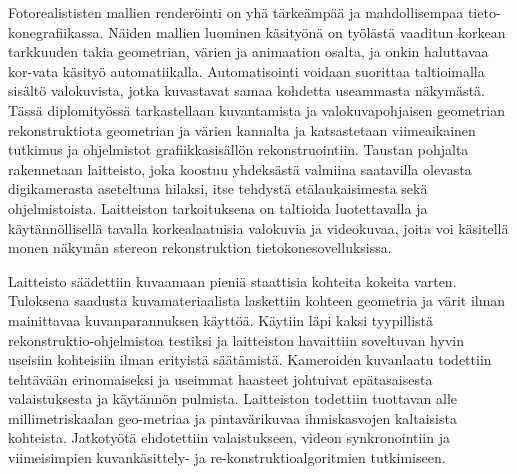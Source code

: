 \begin{abstractpage}[finnish]
Fotorealististen mallien renderöinti on yhä tärkeämpää ja mahdollisempaa tieto-konegrafiikassa.
Näiden mallien luominen käsityönä on työlästä vaaditun korkean tarkkuuden takia geometrian, värien ja animaation osalta, ja onkin haluttavaa kor-vata käsityö automatiikalla.
Automatisointi voidaan suorittaa taltioimalla sisältö valokuvista, jotka kuvastavat samaa kohdetta useammasta näkymästä.
Tässä diplomityössä tarkastellaan kuvantamista ja valokuvapohjaisen geometrian rekonstruktiota geometrian ja värien kannalta ja katsastetaan viimeaikainen tutkimus ja ohjelmistot grafiikkasisällön rekonstruointiin.
Taustan pohjalta rakennetaan laitteisto, joka koostuu yhdeksästä valmiina saatavilla olevasta digikamerasta aseteltuna hilaksi, itse tehdystä etälaukaisimesta sekä ohjelmistoista.
Laitteiston tarkoituksena on taltioida luotettavalla ja käytännöllisellä tavalla korkealaatuisia valokuvia ja videokuvaa, joita voi käsitellä monen näkymän stereon rekonstruktion tietokonesovelluksissa.

Laitteisto säädettiin kuvaamaan pieniä staattisia kohteita kokeita varten.
Tuloksena saadusta kuvamateriaalista laskettiin kohteen geometria ja värit ilman mainittavaa kuvanparannuksen käyttöä.
Käytiin läpi kaksi tyypillistä rekonstruktio-ohjelmistoa testiksi ja laitteiston havaittiin soveltuvan hyvin useisiin kohteisiin ilman erityistä säätämistä.
Kameroiden kuvanlaatu todettiin tehtävään erinomaiseksi ja useimmat haasteet johtuivat epätasaisesta valaistuksesta ja käytännön pulmista.
Laitteiston todettiin tuottavan alle millimetriskaalan geo-metriaa ja pintavärikuvaa ihmiskasvojen kaltaisista kohteista.
Jatkotyötä ehdotettiin valaistukseen, videon synkronointiin ja viimeisimpien kuvankäsittely- ja re-konstruktioalgoritmien tutkimiseen.
\end{abstractpage}
